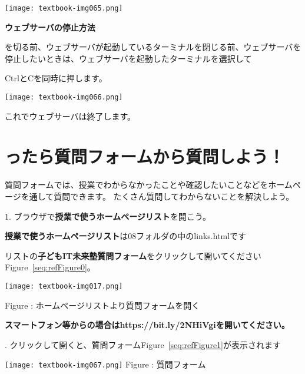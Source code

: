 \begin{center}
	\texttt{[image: textbook-img065.png]}
\end{center}
{\bfseries ウェブサーバの停止方法}

を切る前、ウェブサーバが起動しているターミナルを閉じる前、ウェブサーバを停止したいときは、ウェブサーバを起動したターミナルを選択して

CtrlとCを同時に押します。

\begin{center}
	\texttt{[image: textbook-img066.png]}
\end{center}
これでウェブサーバは終了します。

\section{ったら質問フォームから質問しよう！}
質問フォームでは、授業でわからなかったことや確認したいことなどをホームページを通して質問できます。
たくさん質問してわからないことを解決しよう。

1.
ブラウザで\textbf{授業で使うホームページリスト}を開こう。

\textbf{授業で使うホームページリスト}は08フォルダの中のlinks.htmlです

リストの\textbf{子どもIT未来塾質問フォーム}をクリックして開いてくださいFigure~\ref{seq:refFigure0}。

\begin{center}
\begin{minipage}{10.88cm}
\texttt{[image: textbook-img017.png]}

Figure {\theFigure\label{seq:refFigure0}}:
ホームページリストより質問フォームを開く
\end{minipage}
\end{center}
{\bfseries スマートフォン等からの場合はhttps://bit.ly/2NHiVgiを開いてください。}

.
クリックして開くと、質問フォームFigure~\ref{seq:refFigure1}が表示されます

\begin{center}
\begin{minipage}{0.9\textwidth}
{\upshape \texttt{[image: textbook-img067.png]}
\newline
Figure {\theFigure\label{seq:refFigure1}}: 質問フォーム}
\end{minipage}
\end{center}

